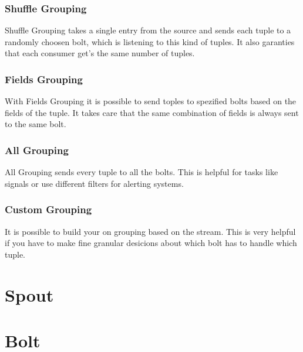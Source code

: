 \subsubsection{Shuffle Grouping}
Shuffle Grouping takes a single entry from the source and sends each tuple to a randomly choosen bolt,
which is listening to this kind of tuples. It also garanties that each consumer get's the same number of tuples.

\subsubsection{Fields Grouping}
With Fields Grouping it is possible to send toples to spezified bolts based on the fields of the tuple.
It takes care that the same combination of fields is always sent to the same bolt.

\subsubsection{All Grouping}
All Grouping sends every tuple to all the bolts. This is helpful for tasks like signals or
use different filters for alerting systems.

\subsubsection{Custom Grouping}
It is possible to build your on grouping based on the stream. This is very helpful if you have to make
fine granular desicions about which bolt has to handle which tuple.


\newpage

\section{Spout}


\newpage

\section{Bolt}

